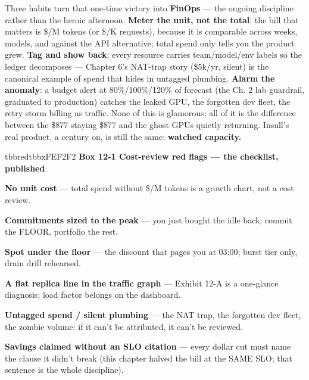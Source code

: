 Three habits turn that one-time victory into \textbf{FinOps} — the ongoing discipline rather than the heroic afternoon. \textbf{Meter the unit, not the total}: the bill that matters is \$/M tokens (or \$/K requests), because it is comparable across weeks, models, and against the API alternative; total spend only tells you the product grew. \textbf{Tag and show back}: every resource carries team/model/env labels so the ledger decomposes — Chapter 6's NAT-trap story (\$5k/yr, silent) is the canonical example of spend that hides in untagged plumbing. \textbf{Alarm the anomaly}: a budget alert at 80\%/100\%/120\% of forecast (the Ch. 2 lab guardrail, graduated to production) catches the leaked GPU, the forgotten dev fleet, the retry storm billing as traffic. None of this is glamorous; all of it is the difference between the \$877 staying \$877 and the ghost GPUs quietly returning. Insull's real product, a century on, is still the same: \textbf{watched capacity.}

\begin{calloutbox}{tbbred}{tbbxFEF2F2}
{\normalsize\bfseries\color{tbbx991B1B}Box 12-1  Cost-review red flags — the checklist, published}\par\vspace{3pt}
\begin{tbbitemize}
  \item \textbf{No unit cost} — total spend without \$/M tokens is a growth chart, not a cost review.
  \item \textbf{Commitments sized to the peak} — you just bought the idle back; commit the FLOOR, portfolio the rest.
  \item \textbf{Spot under the floor} — the discount that pages you at 03:00; burst tier only, drain drill rehearsed.
  \item \textbf{A flat replica line in the traffic graph} — Exhibit 12-A is a one-glance diagnosis; load factor belongs on the dashboard.
  \item \textbf{Untagged spend / silent plumbing} — the NAT trap, the forgotten dev fleet, the zombie volume: if it can't be attributed, it can't be reviewed.
  \item \textbf{Savings claimed without an SLO citation} — every dollar cut must name the clause it didn't break (this chapter halved the bill at the SAME SLO; that sentence is the whole discipline).
\end{tbbitemize}
\end{calloutbox}

\vspace{3.0pt}

